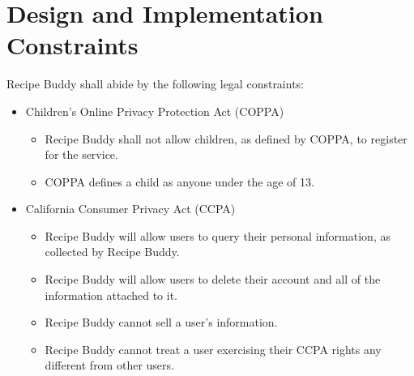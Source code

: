 \documentclass{scrreprt}
\begin{document}
\section{Design and Implementation Constraints}
Recipe Buddy shall abide by the following legal constraints:
\begin{itemize}
    \item Children's Online Privacy Protection Act (COPPA)
    \begin{itemize}
        \item Recipe Buddy shall not allow children, as defined by COPPA, to register for the service.
        \item COPPA defines a child as anyone under the age of 13.
    \end{itemize}
    \item California Consumer Privacy Act (CCPA)
    \begin{itemize}
        \item Recipe Buddy will allow users to query their personal information, as collected by Recipe Buddy.
        \item Recipe Buddy will allow users to delete their account and all of the information attached to it.
        \item Recipe Buddy cannot sell a user's information.
        \item Recipe Buddy cannot treat a user exercising their CCPA rights any different from other users.
    \end{itemize}
\end{itemize}  
\end{document}

